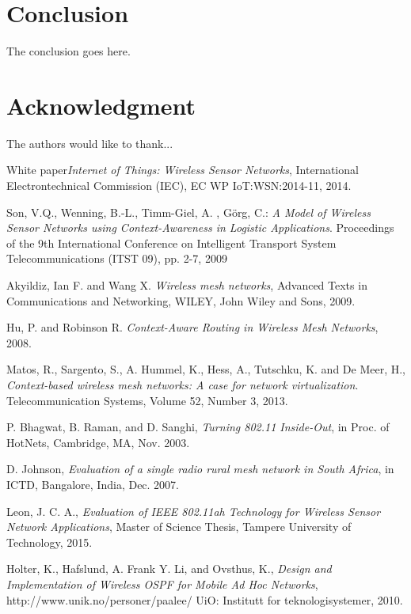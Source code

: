 \documentclass[conference]{IEEEtran}
\begin{document}
\section{Conclusion}
The conclusion goes here.




\section*{Acknowledgment}
The authors would like to thank...




\begin{thebibliography}{1}

White paper\emph{Internet of Things: Wireless Sensor Networks}, International Electrontechnical Commission (IEC), EC WP IoT:WSN:2014-11, 2014.

Son, V.Q., Wenning, B.-L., Timm-Giel, A. , Görg, C.: \emph{A Model of Wireless Sensor Networks using Context-Awareness in Logistic Applications}. Proceedings of the 9th International Conference on Intelligent Transport System Telecommunications (ITST 09), pp. 2-7, 2009

Akyildiz, Ian F. and Wang X. \emph{Wireless mesh networks}, Advanced Texts in Communications and Networking, WILEY, John Wiley and Sons, 2009.

Hu, P. and Robinson R. \emph{Context-Aware Routing in Wireless Mesh Networks}, 2008.

Matos, R., Sargento, S., A. Hummel, K., Hess, A., Tutschku, K. and De Meer, H., \emph{Context-based wireless mesh networks: A case for network virtualization}. Telecommunication Systems, Volume 52, Number 3, 2013.

P. Bhagwat, B. Raman, and D. Sanghi, \emph{Turning 802.11 Inside-Out}, in
Proc. of HotNets, Cambridge, MA, Nov. 2003.

D. Johnson, \emph{Evaluation of a single radio rural mesh network in South
Africa}, in ICTD, Bangalore, India, Dec. 2007.

Leon, J. C. A., \emph{Evaluation of IEEE 802.11ah Technology for Wireless Sensor Network Applications}, Master of Science Thesis, Tampere University of Technology, 2015.

Holter, K., Hafslund, A. Frank Y. Li, and Ovsthus, K., \emph{Design and Implementation of Wireless OSPF for Mobile Ad Hoc Networks}, http://www.unik.no/personer/paalee/
UiO: Institutt for teknologisystemer, 2010.


\end{thebibliography}
\end{document}
